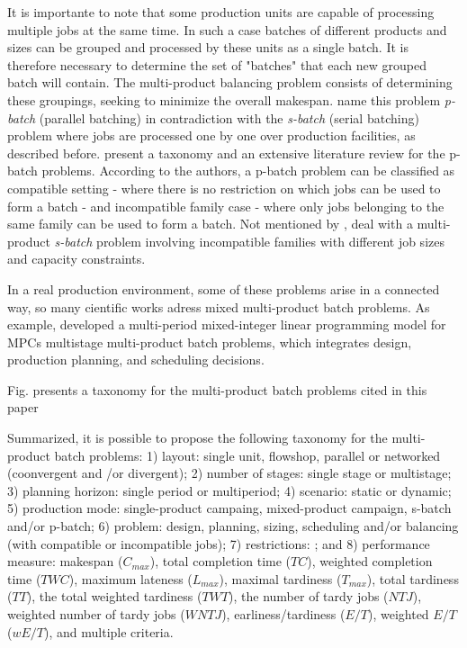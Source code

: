 \documentclass[authoryear,manuscript,12pt]{elsarticle}
\begin{document}
It is importante to note that some production units are capable of processing multiple jobs at the same time. In such a case batches of different products and sizes can be grouped and processed by these units as a single batch. It is therefore necessary to determine the set of "batches" that each new grouped batch will contain. The multi-product balancing problem consists of determining these groupings, seeking to minimize the overall makespan. \cite{KashanOzturk2022} name this problem \emph{p-batch} (parallel batching) in contradiction with the \emph{s-batch} (serial batching) problem where jobs are processed one by one over production facilities, as described before.  \cite{FowlerMonch2022} present a taxonomy and an extensive literature review for the p-batch problems. According to the authors, a p-batch problem can be classified as compatible setting - where there is no restriction on which jobs can be used to form a batch - and incompatible family case - where only jobs belonging to the same family can be used to form a batch. Not mentioned by \cite{FowlerMonch2022}, \cite{LiEtAl2022} deal with a multi-product \emph{s-batch} problem involving incompatible families with different job sizes and capacity constraints. 

In a real production environment, some of these problems arise in a connected way, so many cientific works adress mixed multi-product batch problems. As example, \cite{FumeroEtAl2016} developed a multi-period mixed-integer linear programming model for MPCs multistage multi-product batch problems, which integrates design, production planning, and scheduling decisions.

Fig. \label{fig:taxonomy} presents a taxonomy for the multi-product batch problems cited in this paper


Summarized, it is possible to propose the following taxonomy for the multi-product batch problems: 1) layout: single unit, flowshop, parallel or networked (coonvergent and /or divergent); 2) number of stages: single stage or multistage; 3) planning horizon: single period or multiperiod; 4) scenario: static or dynamic; 5) production mode: single-product campaing, mixed-product campaign, s-batch and/or p-batch; 6) problem: design, planning, sizing, scheduling and/or balancing (with compatible or incompatible jobs); 7) restrictions: ; and 8) performance measure: makespan ($C_{max}$), total completion time ($TC$), weighted completion time ($TWC$), maximum lateness ($L_{max}$), maximal tardiness ($T_{max}$), total tardiness ($TT$), the total weighted tardiness ($TWT$), the number of tardy jobs ($NTJ$), weighted number of tardy jobs ($WNTJ$), earliness/tardiness ($E/T$), weighted $E/T$ ($wE/T$), and multiple criteria.
\end{document}
